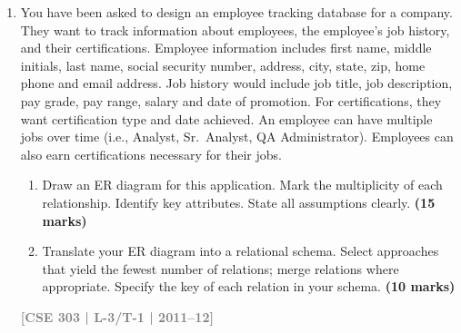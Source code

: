 \documentclass[12pt,a3paper]{article}
\newcommand{\yr}[1]{\hfill\textcolor{gray}{\small\textbf{[#1]}}}
\newcommand{\mk}[1]{\textcolor{orange!70!black}{\small\textbf{(#1 marks)}}}
\begin{document}
\begin{enumerate}
\begin{tcolorbox}[enhanced,breakable,ansbox,colback=cA!4,colframe=cA,boxrule=0.8pt,arc=5pt,title={\textbf{Answer}},fonttitle=\bfseries\color{white},colbacktitle=cA]
\begin{center}
{
}
\end{center}

\end{tcolorbox}

\item You have been asked to design an employee tracking database for a company. They want to track information about employees, the employee's job history, and their certifications. Employee information includes first name, middle initials, last name, social security number, address, city, state, zip, home phone and email address. Job history would include job title, job description, pay grade, pay range, salary and date of promotion. For certifications, they want certification type and date achieved. An employee can have multiple jobs over time (i.e., Analyst, Sr.\ Analyst, QA Administrator). Employees can also earn certifications necessary for their jobs.
\begin{enumerate}
   
\item Draw an ER diagram for this application. Mark the multiplicity of each relationship. Identify key attributes. State all assumptions clearly.
\mk{15}
\item Translate your ER diagram into a relational schema. Select approaches that yield the fewest number of relations; merge relations where appropriate. Specify the key of each relation in your schema.
\mk{10}
\end{enumerate}
\yr{CSE 303 | L-3/T-1 | 2011--12}

\begin{tcolorbox}[enhanced,breakable,ansbox,colback=cA!4,colframe=cA,boxrule=0.8pt,arc=5pt,title={\textbf{Answer}},fonttitle=\bfseries\color{white},colbacktitle=cA]


\end{tcolorbox}
\end{enumerate}
\end{document}
